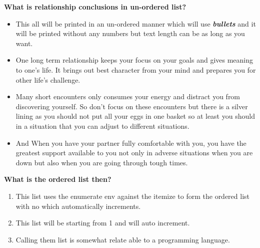 \documentclass[12pt, letterpaper]{article}
\begin{document}
\textbf{What is relationship conclusions in un-ordered list?}
\begin{itemize}
    \item This all will be printed in an un-ordered manner which will use \textbf{\emph{bullets}} and it will be printed without any numbers but text length can be as long as you want. 
    \item One long term relationship keeps your focus on your goals and gives meaning to one's life. It brings out best character from your mind and prepares you for other life's challenge.
    \item Many short encounters only consumes your energy and distract you from discovering yourself. So don't focus on these encounters but there is a silver lining as you should not put all your eggs in one basket so at least you should in a situation that you can adjust to different situations.
    \item And When you have your partner fully comfortable with you, you have the greatest support available to you not only in adverse situations when you are down but also when you are going through tough times.
\end{itemize}

\textbf{What is the ordered list then?}
\begin{enumerate}
    \item This list uses the enumerate env against the itemize to form the ordered list with no which automatically increments.
    \item This list will be starting from 1 and will auto increment.
    \item Calling them list is somewhat relate able to a programming language.
\end{enumerate}
\end{document}
